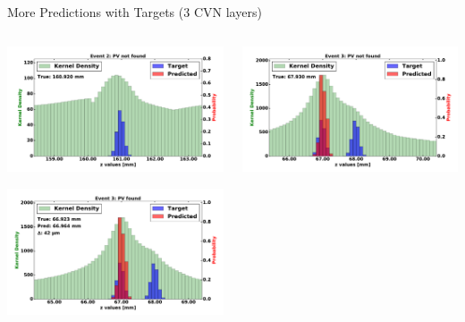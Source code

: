 %


\begin{frame}{More Predictions with Targets (3 CVN layers)}
  \begin{columns}[c]
        \begin{center}
            \includegraphics[width=1\textwidth,height=0.45\textwidth, trim=18 0 18 0]{images/120000_3layer_16.pdf}
    
            \includegraphics[width=1\textwidth, height=0.45\textwidth,trim=18 0 18 0]{images/120000_3layer_17.pdf}

        \end{center}
        \begin{center}
           \includegraphics[width=1\textwidth, height=0.45\textwidth, trim=18 0 18 0]{images/120000_3layer_18.pdf}
    

\end{center}
\end{columns}
\end{frame}
